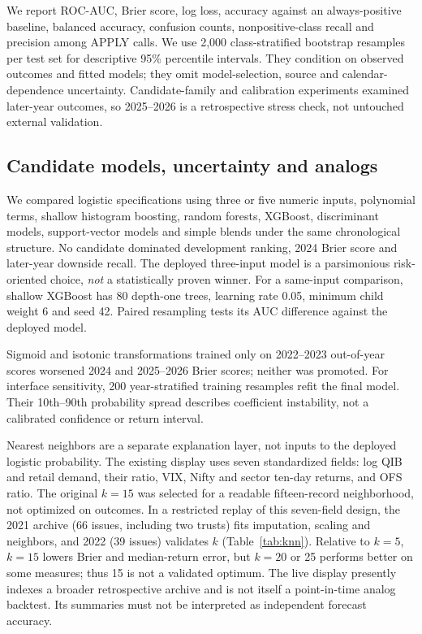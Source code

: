 \documentclass[runningheads]{llncs}
\begin{document}
We report ROC-AUC, Brier score, log loss, accuracy against an always-positive baseline, balanced accuracy, confusion counts, nonpositive-class recall and precision among APPLY calls. We use 2,000 class-stratified bootstrap resamples per test set for descriptive 95\% percentile intervals. They condition on observed outcomes and fitted models; they omit model-selection, source and calendar-dependence uncertainty. Candidate-family and calibration experiments examined later-year outcomes, so 2025--2026 is a retrospective stress check, not untouched external validation.

\subsection{Candidate models, uncertainty and analogs}
We compared logistic specifications using three or five numeric inputs, polynomial terms, shallow histogram boosting, random forests, XGBoost, discriminant models, support-vector models and simple blends under the same chronological structure. No candidate dominated development ranking, 2024 Brier score and later-year downside recall. The deployed three-input model is a parsimonious risk-oriented choice, \emph{not} a statistically proven winner. For a same-input comparison, shallow XGBoost has 80 depth-one trees, learning rate 0.05, minimum child weight 6 and seed 42. Paired resampling tests its AUC difference against the deployed model.

Sigmoid and isotonic transformations trained only on 2022--2023 out-of-year scores worsened 2024 and 2025--2026 Brier scores; neither was promoted. For interface sensitivity, 200 year-stratified training resamples refit the final model. Their 10th--90th probability spread describes coefficient instability, not a calibrated confidence or return interval.

Nearest neighbors are a separate explanation layer, not inputs to the deployed logistic probability. The existing display uses seven standardized fields: log QIB and retail demand, their ratio, VIX, Nifty and sector ten-day returns, and OFS ratio. The original $k=15$ was selected for a readable fifteen-record neighborhood, not optimized on outcomes. In a restricted replay of this seven-field design, the 2021 archive (66 issues, including two trusts) fits imputation, scaling and neighbors, and 2022 (39 issues) validates $k$ (Table~\ref{tab:knn}). Relative to $k=5$, $k=15$ lowers Brier and median-return error, but $k=20$ or 25 performs better on some measures; thus 15 is not a validated optimum. The live display presently indexes a broader retrospective archive and is not itself a point-in-time analog backtest. Its summaries must not be interpreted as independent forecast accuracy.
\end{document}
